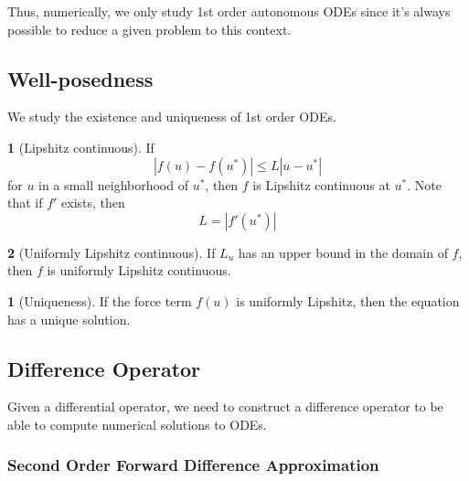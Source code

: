 \documentclass[12pt]{article}
\theoremstyle{definition}
\newtheorem{definition}{\color{NavyBlue}{\textbf{Definition}}}
\newtheorem{theorem}{\color{ForestGreen}{\textbf{Theorem}}}
\theoremstyle{definition}
\begin{document}
Thus, numerically, we only study 1st order autonomous ODEs since it's always possible to reduce a given problem to this context. 

\subsection{Well-posedness}
We study the existence and uniqueness of 1st order ODEs.

\begin{definition}[Lipshitz continuous]
	If 
	\begin{equation}
		|f(u) - f(u^*)| \leq L|u-u^*|
	\end{equation}
	for $u$ in a small neighborhood of $u^*$, then $f$ is Lipshitz continuous at $u^*$. Note that if $f'$ exists, then 
	\begin{equation}
		L = |f'(u^*)|
	\end{equation}
\end{definition}

\begin{definition}[Uniformly Lipshitz continuous]
	If $L_u$ has an upper bound in the domain of $f$, then $f$ is uniformly Lipshitz continuous.
\end{definition}

\begin{theorem}[Uniqueness]
	If the force term $f(u)$ is uniformly Lipshitz, then the equation has a unique solution.
\end{theorem}

\subsection{Difference Operator}
Given a differential operator, we need to construct a difference operator to be able to compute numerical solutions to ODEs. 

\subsubsection{Second Order Forward Difference Approximation}
\end{document}
